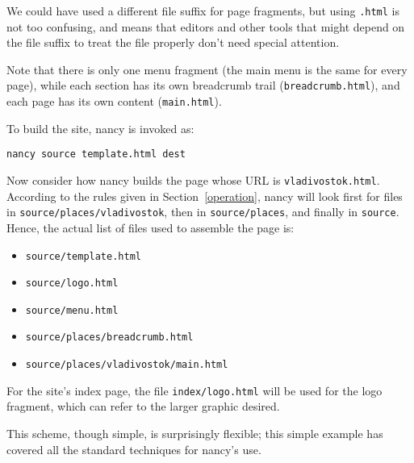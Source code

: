 \documentclass[english]{scrartcl}
\begin{document}
We could have used a different file suffix for page fragments, but using \verb|.html| is not too confusing, and means that editors and other tools that might depend on the file suffix to treat the file properly don't need special attention.

Note that there is only one menu fragment (the main menu is the same for every page), while each section has its own breadcrumb trail (\verb|breadcrumb.html|), and each page has its own content (\verb|main.html|).

To build the site, nancy is invoked as:

\begin{verbatim}
nancy source template.html dest
\end{verbatim}

Now consider how nancy builds the page whose URL is \verb|vladivostok.html|. According to the rules given in Section~\ref{operation}, nancy will look first for files in \verb|source/places/vladivostok|, then in \verb|source/places|, and finally in \verb|source|. Hence, the actual list of files used to assemble the page is:

\begin{itemize}
\item \verb|source/template.html|
\item \verb|source/logo.html|
\item \verb|source/menu.html|
\item \verb|source/places/breadcrumb.html|
\item \verb|source/places/vladivostok/main.html|
\end{itemize}

For the site's index page, the file \verb|index/logo.html| will be used for the logo fragment, which can refer to the larger graphic desired.

This scheme, though simple, is surprisingly flexible; this simple example has covered all the standard techniques for nancy's use.
\end{document}
